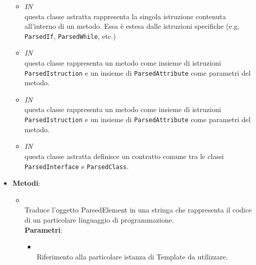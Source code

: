 \begin{itemize}
\begin{itemize}
\item \textit{IN} \hyperref[\nogloxy{swedesigner::server::project::ParsedInstruction}]{}\\
questa classe astratta rappresenta la singola istruzione contenuta all'interno di un metodo. Essa è estesa dalle istruzioni specifiche (e.g. \texttt{ParsedIf}, \texttt{ParsedWhile}, etc.)
\item \textit{IN} \hyperref[\nogloxy{swedesigner::server::project::ParsedMethod}]{}\\
questa classe rappresenta un metodo come insieme di istruzioni \texttt{ParsedIstruction} e un insieme di \texttt{ParsedAttribute} come parametri del metodo.
\item \textit{IN} \hyperref[\nogloxy{swedesigner::server::project::ParsedMethod}]{}\\
questa classe rappresenta un metodo come insieme di istruzioni \texttt{ParsedIstruction} e un insieme di \texttt{ParsedAttribute} come parametri del metodo.
\item \textit{IN} \hyperref[\nogloxy{swedesigner::server::project::ParsedType}]{}\\
questa classe astratta definisce un contratto comune tra le classi \texttt{ParsedInterface} e \texttt{ParsedClass}. 
\end{itemize}
\item \textbf{Metodi}:
\begin{itemize}
\item {}
\\ Traduce l'oggetto ParsedElement in una stringa che rappresenta il codice di un particolare linguaggio di programmazione.
\\ \textbf{Parametri}:
\begin{itemize}
\item {}
\\ Riferimento alla particolare istanza di Template da utilizzare.
\end{itemize}
\end{itemize}
\end{itemize}

